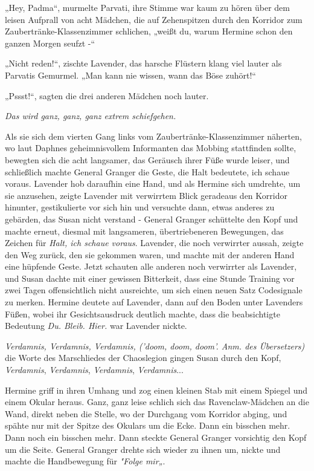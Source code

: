 {„Hey, Padma“, murmelte Parvati, ihre Stimme war kaum zu hören über dem leisen Aufprall von acht Mädchen, die auf Zehenspitzen durch den Korridor zum Zaubertränke-Klassenzimmer schlichen, „weißt du, warum Hermine schon den ganzen Morgen seufzt -“

„Nicht reden!“, zischte Lavender, das harsche Flüstern klang viel lauter als Parvatis Gemurmel. „Man kann nie wissen, wann das Böse zuhört!“

„Pssst!“, sagten die drei anderen Mädchen noch lauter.

\emph{Das wird ganz, ganz, ganz extrem schiefgehen.}

Als sie sich dem vierten Gang links vom Zaubertränke-Klassenzimmer näherten, wo laut Daphnes geheimnisvollem Informanten das Mobbing stattfinden sollte, bewegten sich die acht langsamer, das Geräusch ihrer Füße wurde leiser, und schließlich machte General Granger die Geste, die Halt bedeutete, ich schaue voraus. Lavender hob daraufhin eine Hand, und als Hermine sich umdrehte, um sie anzusehen, zeigte Lavender mit verwirrtem Blick geradeaus den Korridor hinunter, gestikulierte vor sich hin und versuchte dann, etwas anderes zu gebärden, das Susan nicht verstand - General Granger schüttelte den Kopf und machte erneut, diesmal mit langsameren, übertriebeneren Bewegungen, das Zeichen für \emph{Halt, ich schaue voraus}. Lavender, die noch verwirrter aussah, zeigte den Weg zurück, den sie gekommen waren, und machte mit der anderen Hand eine hüpfende Geste. Jetzt schauten alle anderen noch verwirrter als Lavender, und Susan dachte mit einer gewissen Bitterkeit, dass eine Stunde Training vor zwei Tagen offensichtlich nicht ausreichte, um sich einen neuen Satz Codesignale zu merken. Hermine deutete auf Lavender, dann auf den Boden unter Lavenders Füßen, wobei ihr Gesichtsausdruck deutlich machte, dass die beabsichtigte Bedeutung \emph{Du. Bleib. Hier.} war Lavender nickte.

\emph{Verdamnis, Verdamnis, Verdamnis, ('doom, doom, doom'. Anm. des Übersetzers)} die Worte des Marschliedes der Chaoslegion gingen Susan durch den Kopf, \emph{Verdamnis}, \emph{Verdamnis}, \emph{Verdamnis}, \emph{Verdamnis}...

Hermine griff in ihren Umhang und zog einen kleinen Stab mit einem Spiegel und einem Okular heraus. Ganz, ganz leise schlich sich das Ravenclaw-Mädchen an die Wand, direkt neben die Stelle, wo der Durchgang vom Korridor abging, und spähte nur mit der Spitze des Okulars um die Ecke. Dann ein bisschen mehr. Dann noch ein bisschen mehr. Dann steckte General Granger vorsichtig den Kopf um die Seite. General Granger drehte sich wieder zu ihnen um, nickte und machte die Handbewegung für \emph{"Folge mir„}.

}
